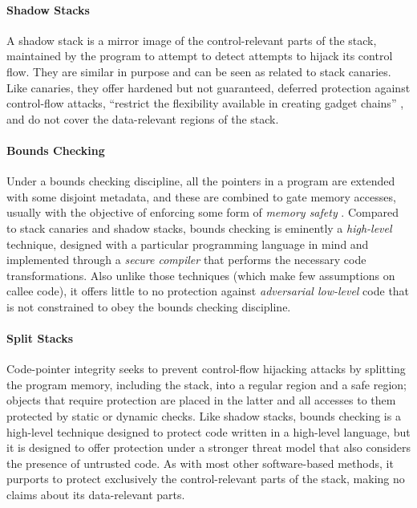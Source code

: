 \paragraph{Shadow Stacks}
%
A shadow stack is a mirror image of the control-relevant parts of the stack,
maintained by the program to attempt to detect attempts to hijack its control
flow. They are similar in purpose and can be seen as related to stack canaries.
Like canaries, they offer hardened but not guaranteed, deferred protection
against control-flow attacks, ``restrict the flexibility available in creating
gadget chains'' \cite{Shanbhogue+19}, and do not cover the data-relevant regions
of the stack.
%

\paragraph{Bounds Checking}
%
Under a bounds checking discipline, all the pointers in a program are extended
with some disjoint metadata, and these are combined to gate memory accesses,
usually with the objective of enforcing some form of \emph{memory
safety} .
%
Compared to stack canaries and shadow stacks, bounds checking is eminently
a \emph{high-level} technique, designed with a particular programming language
in mind and implemented through a \emph{secure compiler} \cite{} that performs
the necessary code transformations. Also unlike those techniques (which make few
assumptions on callee code), it offers little to no protection
against \emph{adversarial low-level} code that is not constrained to obey the
bounds checking discipline.
%

\paragraph{Split Stacks}
%
Code-pointer integrity seeks to prevent control-flow hijacking attacks by
splitting the program memory, including the stack, into a regular region and a
safe region; objects that require protection are placed in the latter and
all accesses to them protected by static or dynamic checks.
%
Like shadow stacks, bounds checking is a high-level technique designed to
protect code written in a high-level language, but it is designed to
offer protection under a stronger threat model that also considers the presence
of untrusted code. As with most other software-based methods, it purports to
protect exclusively the control-relevant parts of the stack, making no claims
about its data-relevant parts.


